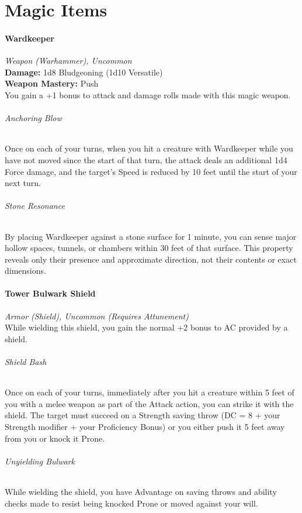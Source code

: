 \documentclass[letterpaper,openany,oneside,twocolumn]{book}
\begin{document}
\part*{Magic Items}
\subsection*{Wardkeeper}
\textit{Weapon (Warhammer), Uncommon}\\
\textbf{Damage:} 1d8 Bludgeoning (1d10 Versatile)\\
\textbf{Weapon Mastery:} Push\\
You gain a +1 bonus to attack and damage rolls made with this magic weapon.\\
\paragraph*{Anchoring Blow} Once on each of your turns, when you hit a creature with Wardkeeper while you have not moved since the start of that turn, the attack deals an additional 1d4 Force damage, and the target's Speed is reduced by 10 feet until the start of your next turn.\\
\paragraph*{Stone Resonance} By placing Wardkeeper against a stone surface for 1 minute, you can sense major hollow spaces, tunnels, or chambers within 30 feet of that surface. This property reveals only their presence and approximate direction, not their contents or exact dimensions.

\subsection*{Tower Bulwark Shield}
\textit{Armor (Shield), Uncommon (Requires Attunement)}\\
While wielding this shield, you gain the normal +2 bonus to AC provided by a shield.\\
\paragraph*{Shield Bash} Once on each of your turns, immediately after you hit a creature within 5 feet of you with a melee weapon as part of the Attack action, you can strike it with the shield. The target must succeed on a Strength saving throw (DC = 8 + your Strength modifier + your Proficiency Bonus) or you either push it 5 feet away from you or knock it Prone.\\
\paragraph*{Unyielding Bulwark} While wielding the shield, you have Advantage on saving throws and ability checks made to resist being knocked Prone or moved against your will.
\end{document}
